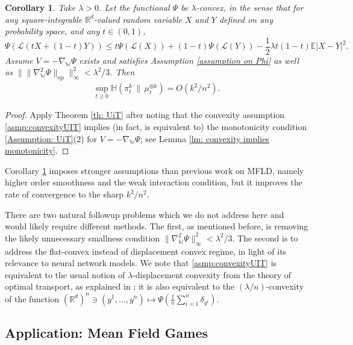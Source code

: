 \documentclass[11pt,reqno]{amsart}
\numberwithin{equation}{section}
\newtheorem{corollary}[theorem]{Corollary}
\theoremstyle{definition}
\def\E{{\mathbb E}}
\def\R{{\mathbb R}}
\def\Law{\mathcal{L}}
\newcommand{\wgrad}{\nabla_{\W}}
\newcommand{\W}{\mathbb W}
\newcommand{\ent}{ \mathbb H}
\begin{document}
\begin{corollary}
    \label{co: Mean Field Langevin Dynamics}
    Take $\lambda>0$. Let the functional $\Psi$ be $\lambda$-convex, in the sense that for any square-integrable $\R^d$-valued random variable $X$ and $Y$ defined on any probability space, and any $t \in (0,1)$,
    \begin{equation}
    \Psi(\Law(t X + (1-t)Y)) \le t\Psi(\Law (X)) + (1-t)\Psi(\Law (Y)) - \frac12\lambda t(1-t)\E|X-Y|^2. \label{asmp:convexityUIT}
    \end{equation}
    Assume $V=-\wgrad \Psi$ exists and satisfies Assumption \ref{assumption on Phi} as well as $\|\|\wgrad^2 \Psi\|_{\text{op}}\|^2_\infty < \lambda^2/3$. Then
    \begin{align*}
        \sup_{t\geq 0}\ent (\pi_t^k\,\|\,\mu_t^{\otimes k})=O(k^2/n^2).
    \end{align*}
\end{corollary}
\begin{proof}
Apply Theorem \ref{th: UiT} after noting that the convexity assumption \eqref{asmp:convexityUIT} implies (in fact, is equivalent to) the monotonicity condition \ref{Assumption: UiT}(2) for $V=-\wgrad \Psi$; see Lemma \ref{lm: convexity implies monotonicity}.
\end{proof}


Corollary \ref{co: Mean Field Langevin Dynamics} imposes stronger assumptions than previous work on MFLD, namely higher order smoothness and the weak interaction condition, but it improves the rate of convergence to the sharp $k^2/n^2$. 

There are two natural followup problems which we do not address here and would likely require different methods. The first, as mentioned before, is removing the likely unnecessary smallness condition $\|\wgrad^2 \Psi\|^2_\infty < \lambda^2/3$. The second is to address the flat-convex instead of displacement convex regime, in light of its relevance to neural network models. We note that \eqref{asmp:convexityUIT} is equivalent to the usual notion of $\lambda$-displacement convexity from the theory of optimal transport, as explained in \cite[Lemma 3.6]{GangboConvexity}; it is also equivalent to the $(\lambda/n)$-convexity of the function $(\R^d)^n \ni (y^1,\ldots,y^n) \mapsto \Psi(\frac{1}{n}\sum_{i=1}^n \delta_{y^i})$.



\subsection{Application: Mean Field Games}
\end{document}
